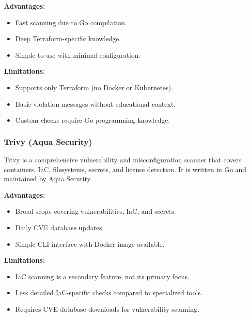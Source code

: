 \textbf{Advantages:}
\begin{itemize}
    \item Fast scanning due to Go compilation.
    \item Deep Terraform-specific knowledge.
    \item Simple to use with minimal configuration.
\end{itemize}

\textbf{Limitations:}
\begin{itemize}
    \item Supports only Terraform (no Docker or Kubernetes).
    \item Basic violation messages without educational context.
    \item Custom checks require Go programming knowledge.
\end{itemize}


\subsubsection{Trivy (Aqua Security)}

Trivy is a comprehensive vulnerability and misconfiguration scanner that covers containers, IaC, filesystems, secrets, and license detection. It is written in Go and maintained by Aqua Security.

\textbf{Advantages:}
\begin{itemize}
    \item Broad scope covering vulnerabilities, IaC, and secrets.
    \item Daily CVE database updates.
    \item Simple CLI interface with Docker image available.
\end{itemize}

\textbf{Limitations:}
\begin{itemize}
    \item IaC scanning is a secondary feature, not its primary focus.
    \item Less detailed IaC-specific checks compared to specialized tools.
    \item Requires CVE database downloads for vulnerability scanning.
\end{itemize}

